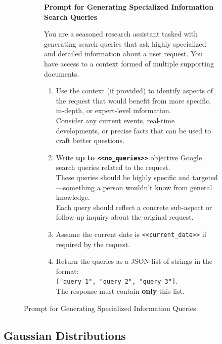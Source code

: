 \begin{figure}[!ht]
  \centering
    \begin{subfigure}{\linewidth}
    \begin{tcolorbox}[colback=gray!5!white, colframe=black!75!black, boxrule=0.5pt, arc=3pt, left=6pt, right=6pt, top=4pt, bottom=4pt]
    
    \textbf{Prompt for Generating Specialized Information Search Queries}

    You are a seasoned research assistant tasked with generating search queries that ask highly specialized and detailed information about a user request. You have access to a context formed of multiple supporting documents.

    \begin{enumerate}
        \item Use the context (if provided) to identify aspects of the request that would benefit from more specific, in-depth, or expert-level information.\\
              Consider any current events, real-time developments, or precise facts that can be used to craft better questions.
        \item Write \textbf{up to \texttt{<<no\_queries>>}} objective Google search queries related to the request.\\
              These queries should be highly specific and targeted—something a person wouldn't know from general knowledge.\\
              Each query should reflect a concrete sub-aspect or follow-up inquiry about the original request.
        \item Assume the current date is \texttt{<<current\_date>>} if required by the request.
        \item Return the queries as a JSON list of strings in the format: \\
              \texttt{["query 1", "query 2", "query 3"]}.\\
              The response must contain \textbf{only} this list.
    \end{enumerate}
    \end{tcolorbox}
    \end{subfigure}
  \caption{Prompt for Generating Specialized Information Queries}
  \label{fig:specialized-information-prompt}
\end{figure}

\subsection{Gaussian Distributions}\label{sec:gaussian}

